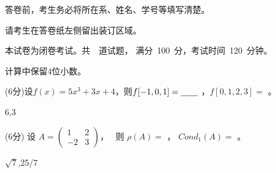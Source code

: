 \documentclass[12pt,letter]{ustcexam}
\def\ds{\displaystyle}
\renewcommand{\biaoti}[1]{\begin{spacing}{1.3}\begin{center}\Large\zihao{2}
                          #1\end{center}\end{spacing}\medskip}
\begin{document}
\begin{CJK*}{UTF8}{song}
\CJKindent \CJKtilde %
\mifengxian

\Makedefen

\vspace{1em}
\begin{notice}
\item 答卷前，考生务必将所在系、姓名、学号等填写清楚。
\item 请考生在答卷纸左侧留出装订区域。
\item 本试卷为闭卷考试。共~\numquestions{}~道试题，
      满分~100~分，考试时间~120~分钟。
\item 计算中保留4位小数。
\end{notice}

\begin{problems}
\qu (6分)设$f(x)=5x^3+3x+4$，则$f[-1,0,1]=\underline{\hspace{1em}}\hspace{0.001em}\underline{\hspace{1em}}\hspace{0.001em}$ ，$f[0,1,2,3]=$ \sixb 。~
\begin{sol}
6,3
\end{sol}

\qu (6分) 设 $ \ds{A=\begin {pmatrix} 1 & 2 \\ -2 & 3 \end {pmatrix}}$，
\ 则 $ \rho(A)=$ \sixb ， $ Cond_1(A) =$ \sixb 。
\begin{sol}
$\sqrt 7$,25/7
\end{sol}


\end{problems}
\end{CJK*}
\end{document}
